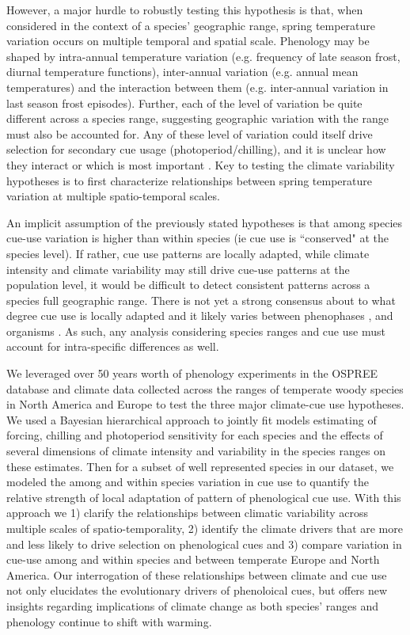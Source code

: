 \documentclass[12pt]{article}\usepackage[]{graphicx}\usepackage[]{color}
\begin{document}
However, a major hurdle to robustly testing this hypothesis is that, when considered in the context of a species' geographic range, spring temperature variation occurs on multiple temporal and spatial scale. Phenology may be shaped by intra-annual temperature variation (e.g. frequency of late season frost, diurnal temperature functions), inter-annual variation (e.g. annual mean temperatures) and the interaction between them (e.g. inter-annual variation in last season frost episodes). Further, each of the level of variation be quite different across a species range, suggesting geographic variation with the range must also be accounted for.
Any of these level of variation could itself drive selection for secondary cue usage (photoperiod/chilling), and it is unclear how they interact or which is most important \citep{Zagmajster:2014aa}. Key to testing the climate variability hypotheses is to first characterize relationships between spring temperature variation at multiple spatio-temporal scales.

\noindent An implicit assumption of the previously stated hypotheses is that among species cue-use variation is higher than within species (ie cue use is ``conserved" at the species level). If rather, cue use patterns are locally adapted, while climate intensity and climate variability may still drive cue-use patterns at the population level, it would be difficult to detect consistent patterns across a species full geographic range. There is not yet a strong consensus about to what degree cue use is locally adapted and it likely varies between phenophases \citep{}, and organisms \citep{}. As such, any analysis considering species ranges and cue use must account for intra-specific differences as well.

\noindent We leveraged over 50 years worth of phenology experiments in the OSPREE database \citep{} and climate data collected across the ranges of temperate woody species in North America and Europe to test the three major climate-cue use hypotheses. We used a Bayesian hierarchical approach to jointly fit models estimating of forcing, chilling and photoperiod sensitivity for each species and the effects of several dimensions of climate intensity and variability in the species ranges on these estimates. Then for a subset of well represented species in our dataset, we modeled the among and within species variation in cue use to quantify the relative strength of local adaptation of pattern of phenological cue use. With this approach we 1) clarify the relationships between climatic variability across multiple scales of spatio-temporality, 2) identify the climate drivers that are more and less likely to drive selection on phenological cues and 3) compare variation in cue-use among and within species and between temperate Europe and North America. Our interrogation of these relationships between climate and cue use not only elucidates the evolutionary drivers of phenoloical cues, but offers new insights regarding implications of climate change as both species' ranges and phenology continue to shift with warming.
\end{document}
